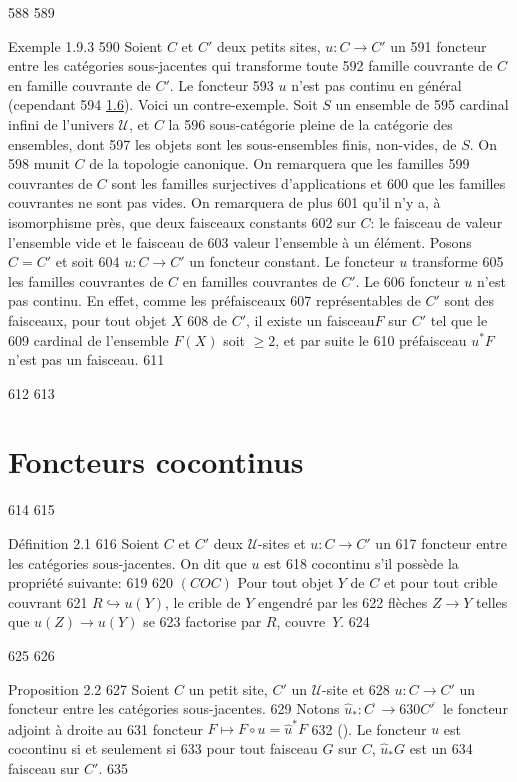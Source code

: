    588	
   589	\begin{enonce*}[remark]{Exemple 1.9.3}
   590	Soient $C$ et $C'$ deux petits sites, $u:C\rightarrow C'$ un
   591	foncteur entre les catégories sous-jacentes qui transforme toute
   592	famille couvrante de $C$ en famille couvrante de $C'$. Le foncteur
   593	$u$ n'est pas continu en général (\cf cependant
   594	\hyperref[III.prop1.6]{1.6}). Voici un contre-exemple. Soit $S$ un ensemble de
   595	cardinal infini de l'univers $𝒰$, et $C$ la
   596	sous-catégorie pleine de la catégorie des ensembles, dont
   597	les objets sont les sous-ensembles finis, non-vides, de $S$. On
   598	munit $C$ de la topologie canonique. On remarquera que les familles
   599	couvrantes de $C$ sont les familles surjectives d'applications et
   600	que les familles couvrantes ne sont pas vides. On remarquera de plus
   601	qu'il n'y a, à isomorphisme près, que deux faisceaux constants
   602	sur $C$: le faisceau de valeur l'ensemble vide et le faisceau de
   603	valeur l'ensemble à un élément. Posons $C=C'$ et soit
   604	$u:C\rightarrow C'$ un foncteur constant. Le foncteur $u$ transforme
   605	les familles couvrantes de $C$ en familles couvrantes de $C'$. Le
   606	foncteur $u$ n'est pas continu. En effet, comme les préfaisceaux
   607	représentables de $C'$ sont des faisceaux, pour tout objet $X$
   608	de $C'$, il existe un faisceau\pageoriginale $F$ sur $C'$ tel que le
   609	cardinal de l'ensemble $F(X)$ soit $\geq 2$, et par suite le
   610	préfaisceau $u^\ast F$ n'est pas un faisceau.
   611	\end{enonce*}
   612	
   613	\section{Foncteurs cocontinus}
   614	
   615	\begin{enonce*}{Définition 2.1}
   616	Soient $C$ et $C'$ deux $𝒰$-sites et $u:C\rightarrow C'$ un
   617	foncteur entre les catégories sous-jacentes. On dit que $u$ est
   618	cocontinu s'il possède la propriété suivante:
   619	
   620	$(COC)$ Pour tout objet $Y$ de $C$ et pour tout crible couvrant
   621	$R\hookrightarrow u(Y)$, le crible de $Y$ engendré par les
   622	flèches $Z\rightarrow Y$ telles que $u(Z)\rightarrow u(Y)$ se
   623	factorise par $R$, couvre~$Y$.
   624	\end{enonce*}
   625	
   626	\begin{enonce*}{Proposition 2.2}
   627	Soient $C$ un petit site, $C'$ un $𝒰$-site et
   628	$u:C\rightarrow C'$ un foncteur entre les catégories sous-jacentes.
   629	Notons $\widehat{u}_{\ast}:C^{\widehat{\phantom{,}}}\rightarrow
   630	{C'}^{\widehat{\phantom{,}}}$ le foncteur adjoint à droite au
   631	foncteur $F\mapsto F\circ u=\widehat{u}^{\ast}F$ {\rm
   632	().} Le foncteur $u$ est cocontinu si et seulement si
   633	pour tout faisceau $G$ sur $C$, $\widehat{u}_{\ast}G$ est un
   634	faisceau sur $C'$.
   635	\end{enonce*}
